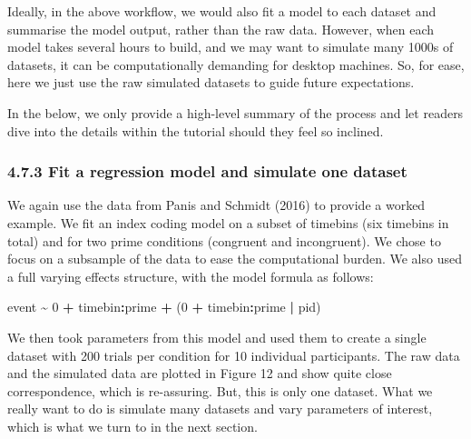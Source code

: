 \documentclass[
  man, donotrepeattitle,floatsintext]{apa6}
\newenvironment{Shaded}{\begin{snugshade}}{\end{snugshade}}
\newcommand{\DecValTok}[1]{\textcolor[rgb]{0.00,0.00,0.81}{#1}}
\newcommand{\NormalTok}[1]{#1}
\newcommand{\SpecialCharTok}[1]{\textcolor[rgb]{0.81,0.36,0.00}{\textbf{#1}}}
\begin{document}
Ideally, in the above workflow, we would also fit a model to each dataset and summarise the model output, rather than the raw data. However, when each model takes several hours to build, and we may want to simulate many 1000s of datasets, it can be computationally demanding for desktop machines. So, for ease, here we just use the raw simulated datasets to guide future expectations.

In the below, we only provide a high-level summary of the process and let readers dive into the details within the tutorial should they feel so inclined.

\subsubsection{4.7.3 Fit a regression model and simulate one dataset}\label{fit-a-regression-model-and-simulate-one-dataset}

We again use the data from Panis and Schmidt (2016) to provide a worked example.
We fit an index coding model on a subset of timebins (six timebins in total) and for two prime conditions (congruent and incongruent). We chose to focus on a subsample of the data to ease the computational burden. We also used a full varying effects structure, with the model formula as follows:

\begin{Shaded}
\begin{Highlighting}[]
\NormalTok{event }\SpecialCharTok{\textasciitilde{}} \DecValTok{0} \SpecialCharTok{+}\NormalTok{ timebin}\SpecialCharTok{:}\NormalTok{prime }\SpecialCharTok{+}\NormalTok{ (}\DecValTok{0} \SpecialCharTok{+}\NormalTok{ timebin}\SpecialCharTok{:}\NormalTok{prime }\SpecialCharTok{|}\NormalTok{ pid)}
\end{Highlighting}
\end{Shaded}

We then took parameters from this model and used them to create a single dataset with 200 trials per condition for 10 individual participants. The raw data and the simulated data are plotted in Figure 12 and show quite close correspondence, which is re-assuring. But, this is only one dataset. What we really want to do is simulate many datasets and vary parameters of interest, which is what we turn to in the next section.
\end{document}
